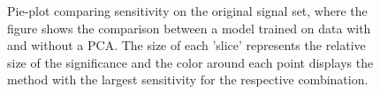 \begin{figure}[H]
    \caption[Pie-plot comparing sensitivity on the original signal set, where the figure shows the comparison between a model training on data 
    with and without a \acs{PCA}.]{Pie-plot comparing sensitivity on the original signal set, where the figure shows the comparison between a model trained on data 
    with and without a \acs{PCA}. The size of each 'slice' represents the relative size of the significance and the color around each 
    point displays the method with the largest sensitivity for the respective combination.}
    \label{fig:NNPCAComp}
\end{figure}


